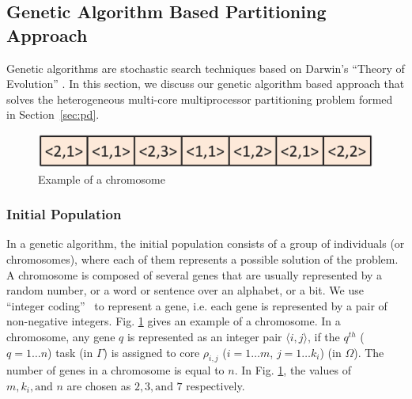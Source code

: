 \documentclass[conference]{IEEEtran}
\begin{document}
\subsection{Genetic Algorithm Based Partitioning Approach}

Genetic algorithms are stochastic search techniques based on Darwin's ``Theory of Evolution'' \cite{Goldberg}.
In this section, we discuss our genetic algorithm based approach that solves the heterogeneous multi-core multiprocessor partitioning problem formed in Section~\ref{sec:pd}.


\begin{figure}[h]
\vspace{-0.1in}
	\begin{center}
		\includegraphics[scale=0.35]{chromo.eps}
	\end{center}
	\vspace{-0.2in}
		\caption{Example of a chromosome}
	\label{fig:chromosome}
\end{figure}
\vspace{-0.1in}

\subsubsection{Initial Population} In a genetic algorithm, the initial population consists of a group of individuals (or chromosomes),
where each of them
represents a possible solution of the problem. 
A chromosome is composed of several genes that are usually
represented by a random number, or a word or sentence over an
alphabet, or a bit. We use ``integer coding''~\cite{Goldberg} to represent a gene,
i.e. each gene is represented by a pair of non-negative integers. Fig. \ref{fig:chromosome} gives an example of a chromosome. %
In a chromosome, any gene $q$ is represented as an integer pair $\langle i,j\rangle$, if  the $q^{th}$ ($q=1\ldots n$) task (in $\Gamma$) is 
assigned to core $\rho_{i,j}$ ($i=1\ldots m$, $j=1\ldots k_i$) (in $\Omega$). The number of genes in a chromosome is equal to $n$.
In  Fig. \ref{fig:chromosome}, the values of $m, k_i, \text{and } n$ are chosen as $2, 3, \text{and } 7$ respectively.
\end{document}
